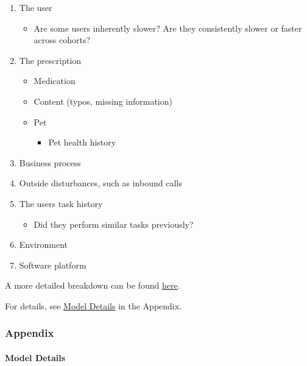\documentclass[
]{article}
\providecommand{\tightlist}{%
  \setlength{\itemsep}{0pt}\setlength{\parskip}{0pt}}
\begin{document}
\begin{enumerate}
\def\labelenumi{\arabic{enumi}.}
\tightlist
\item
  The user

  \begin{itemize}
  \tightlist
  \item
    Are some users inherently slower? Are they consistently slower or
    faster across cohorts?
  \end{itemize}
\item
  The prescription

  \begin{itemize}
  \tightlist
  \item
    Medication
  \item
    Content (typos, missing information)
  \item
    Pet

    \begin{itemize}
    \tightlist
    \item
      Pet health history
    \end{itemize}
  \end{itemize}
\item
  Business process
\item
  Outside disturbances, such as inbound calls
\item
  The user\textquotesingle s task history

  \begin{itemize}
  \tightlist
  \item
    Did they perform similar tasks previously?
  \end{itemize}
\item
  Environment
\item
  Software platform
\end{enumerate}

A more detailed breakdown can be found
\href{../../charts/DUR_detailed.png}{here}.

For details, see \hyperref[model-details]{Model Details} in the
Appendix.

\subsubsection{Appendix}\label{appendix}

\paragraph{Model Details}\label{model-details}
\end{document}

